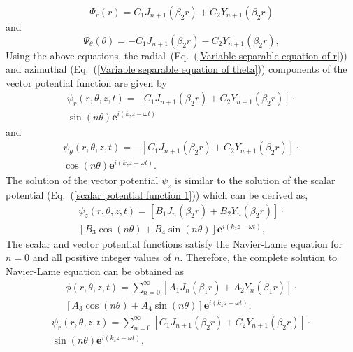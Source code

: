 \documentclass[twocolumn,10pt]{asme2ej}
\begin{document}
\begin{equation}\label{Partial equation of r}
   \Psi_{r}(r) = C_{1}J_{n+1}(\beta_2 r) + C_{2}Y_{n+1}(\beta_2 r) 
\end{equation}
and 
\begin{equation}\label{Partial equation of theta}
    \Psi_{\theta}(\theta) = - C_{1}J_{n+1}(\beta_2 r) - C_{2}Y_{n+1}(\beta_2 r),
\end{equation}
Using the above equations, the radial~(Eq.~(\ref{Variable separable equation of r})) and azimuthal (Eq.~(\ref{Variable separable equation of theta})) components of the vector potential function are given by
\begin{multline}
    \psi_{r}(r,\theta,z,t) = \left[C_{1}J_{n+1}(\beta_2 r) + C_{2}Y_{n+1}(\beta_2 r)\right]\cdot \\ \sin(n\theta)\mathbf{e}^{i(k_{z}z-\omega t)}
\end{multline}
and
\begin{multline}
    \psi_{\theta}(r,\theta,z,t) = -\left[C_{1}J_{n+1}(\beta_2 r) + C_{2}Y_{n+1}(\beta_2 r)\right]\cdot \\ \cos(n\theta)\mathbf{e}^{i(k_{z}z-\omega t)}.
\end{multline}
The solution of the vector potential $\psi_{z}$ is similar to the solution of the scalar potential (Eq.~(\ref{scalar potential function 1})) which can be derived as,
\begin{multline}
   \psi_{z}(r,\theta,z,t) = \left[B_{1}J_{n}(\beta_2 r) + B_{2}Y_{n}(\beta_2r)\right]\cdot \\ \left[B_{3}\cos(n\theta) + B_{4}\sin(n\theta)\right]\mathbf{e}^{i(k_{z}z-\omega t)},
\end{multline}
The scalar and vector potential functions satisfy the Navier-Lame equation for $n=0$ and all positive integer values of $n$. Therefore, the complete solution to Navier-Lame equation can be obtained as
\begin{multline}\label{Scalar potential equation}
    \phi(r,\theta,z,t) = \sum_{n=0}^{\infty}\left[A_{1}J_{n}(\beta_1 r) + A_{2}Y_{n}(\beta_1 r)\right]\cdot\\ \left[A_{3}\cos(n\theta) + A_{4}\sin(n\theta)\right]\mathbf{e}^{i(k_{z}z-\omega t)},
\end{multline}
\begin{multline}\label{Vector potential equation r}
    \psi_{r}(r,\theta,z,t) = \sum_{n=0}^{\infty}\left[C_{1}J_{n+1}(\beta_2r) + C_{2}Y_{n+1}(\beta_2 r)\right]\cdot\\ \sin(n\theta)\mathbf{e}^{i(k_{z}z-\omega t)},
\end{multline}
\end{document}
